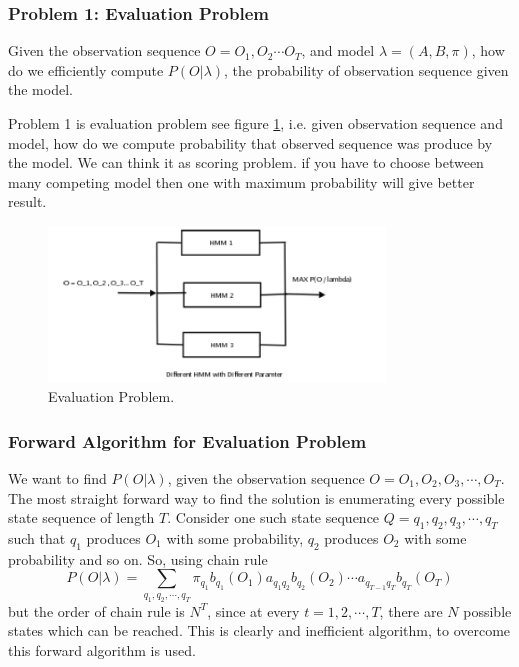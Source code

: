 \documentclass[12pt, a4paper, twoside]{report}
\begin{document}
\subsubsection{Problem 1: Evaluation Problem}
Given the observation sequence $O = O_1, O_2 \cdots O_T$, and model $\lambda = (A, B, \pi)$, how do we efficiently compute $P(O| \lambda)$, the probability of observation sequence given the model.
\par
Problem 1 is evaluation problem see figure \ref{fig:eval-prob}, i.e. given observation sequence and model, how do we compute probability that observed sequence was produce by the model. We can think it as scoring problem. if you have to choose between many competing model then one with maximum probability will give better result. 
\begin{figure}[!h]
	\centering
	\includegraphics[width=0.8\textwidth]
	{images/chapter4/eval-prob}
	\caption{Evaluation Problem.}
	\label{fig:eval-prob}
\end{figure}

\subsubsection{Forward Algorithm for Evaluation Problem}
We want to find $P(O|\lambda)$, given the observation sequence $O = O_1, O_2, O_3, \cdots, O_T$. The most straight forward way to find the solution is enumerating every possible state sequence of length $T$. Consider one such state sequence $Q = q_1, q_2, q_3, \cdots, q_T$ such that $q_1$ produces $O_1$ with some probability, $q_2$ produces $O_2$ with some probability and so on. So, using chain rule
\begin{equation*}
P(O|\lambda) = \sum_{q_1,q_2,\cdots,q_T} \pi_{q_1} b_{q_1}(O_1) a_{q_1 q_2} b_{q_2}(O_2) \cdots a_{q_{T-1} q_T} b_{q_T}(O_T)
\end{equation*}
but the order of chain rule is $N^T$, since at every $t = 1, 2, \cdots , T$, there are $N$ possible states which can be reached. This is clearly and inefficient algorithm, to overcome this forward algorithm is used.
\end{document}
